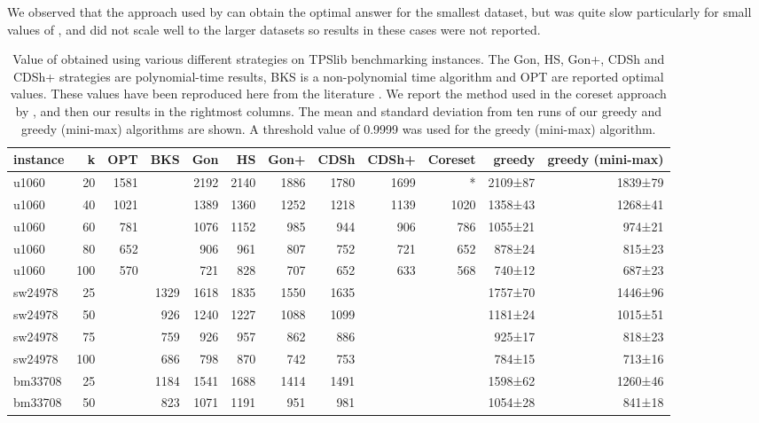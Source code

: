 \documentclass{article}
\begin{document}
We observed that the approach used by \cite{sener2017active} can obtain the optimal answer for the smallest dataset, but was quite slow particularly for small values of , and did not scale well to the larger datasets so results in these cases were not reported.

\begin{table*}[tp]
\centering
\caption{Value of  obtained using various different strategies on TPSlib \citep{reinelt1991tsplib} benchmarking instances. The Gon, HS, Gon+, CDSh and CDSh+ strategies are polynomial-time results, BKS is a non-polynomial time algorithm and OPT are reported optimal values. These values have been reproduced here from the literature \citep{garcia2019approximation}. We report the method used in the coreset approach by \cite{sener2017active}, and then our results in the rightmost columns. The mean and standard deviation from ten runs of our greedy and greedy (mini-max) algorithms are shown. A threshold value of 0.9999 was used for the greedy (mini-max) algorithm. }
\label{tbl:benchmarking_mini_max}
\footnotesize
\begin{tabular}{lr|rr|rrrrr|r|rr}
  \hline
instance & k & OPT & BKS & Gon & HS & Gon+ & CDSh & CDSh+ & Coreset & greedy & greedy (mini-max) \\ 
  \hline
u1060 &  20 & 1581 &  & 2192 & 2140 & 1886 & 1780 & 1699 & * & 2109±87 & 1839±79 \\ 
  u1060 &  40 & 1021 &  & 1389 & 1360 & 1252 & 1218 & 1139 & 1020 & 1358±43 & 1268±41 \\ 
  u1060 &  60 & 781 &  & 1076 & 1152 & 985 & 944 & 906 & 786 & 1055±21 & 974±21 \\ 
  u1060 &  80 & 652 &  & 906 & 961 & 807 & 752 & 721 & 652 & 878±24 & 815±23 \\ 
  u1060 & 100 & 570 &  & 721 & 828 & 707 & 652 & 633 & 568 & 740±12 & 687±23 \\ 
  sw24978 &  25 &  & 1329 & 1618 & 1835 & 1550 & 1635 &&  & 1757±70 & 1446±96 \\ 
  sw24978 &  50 &  & 926 & 1240 & 1227 & 1088 & 1099 &&  & 1181±24 & 1015±51 \\ 
  sw24978 &  75 &  & 759 & 926 & 957 & 862 & 886 &&  & 925±17 & 818±23 \\ 
  sw24978 & 100 &  & 686 & 798 & 870 & 742 & 753 &&  & 784±15 & 713±16 \\ 
  bm33708 &  25 &  & 1184 & 1541 & 1688 & 1414 & 1491 &&  & 1598±62 & 1260±46 \\ 
  bm33708 &  50 &  & 823 & 1071 & 1191 & 951 & 981 &&  & 1054±28 & 841±18 \\ 

\end{tabular}
\end{table*}
\end{document}
